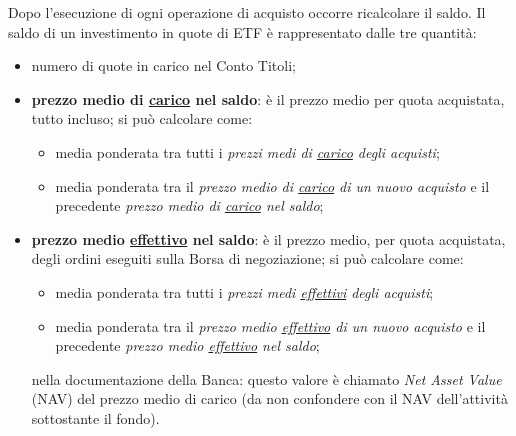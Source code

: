 \documentclass[12pt,a4paper]{article}
\begin{document}
Dopo l'esecuzione  di ogni operazione di  acquisto occorre ricalcolare il  saldo.  Il
saldo di un investimento in quote di ETF è rappresentato dalle tre quantità:
\begin{itemize}
\item numero di quote in carico nel Conto Titoli;
\item \textbf{prezzo  medio di \underline{carico} nel  saldo}: è il prezzo  medio per
  quota acquistata, tutto incluso; si può calcolare come:
  \begin{itemize}
  \item media  ponderata tra  tutti i \emph{prezzi  medi di  \underline{carico} degli
       acquisti};
  \item media ponderata  tra il \emph{prezzo medio di \underline{carico}  di un nuovo
       acquisto} e il precedente \emph{prezzo medio di \underline{carico} nel saldo};
  \end{itemize}
\item \textbf{prezzo medio  \underline{effettivo} nel saldo}: è il  prezzo medio, per
  quota  acquistata,  degli ordini  eseguiti  sulla  Borsa  di negoziazione;  si  può
  calcolare come:
  \begin{itemize}
  \item media  ponderata tra  tutti i  \emph{prezzi medi  \underline{effettivi} degli
       acquisti};
  \item media ponderata  tra il \emph{prezzo medio \underline{effettivo}  di un nuovo
       acquisto} e il precedente \emph{prezzo medio \underline{effettivo} nel saldo};
  \end{itemize}
  nella documentazione della  Banca: questo valore è chiamato  \emph{Net Asset Value}
  (NAV)  del prezzo  medio di  carico  (da non  confondere con  il NAV  dell'attività
  sottostante il fondo).
\end{itemize}
\end{document}
